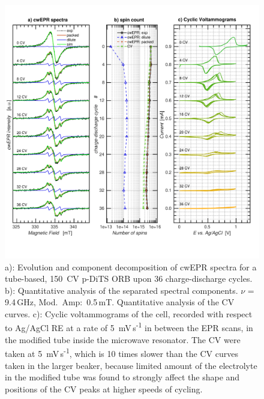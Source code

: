 \begin{figure}[!h]
\center
	\includegraphics[width=1\textwidth]{./operando_epr/figures/degradation/repeated_cycling_degradation_dits.pdf}
	\caption{a): Evolution and component decomposition of cwEPR spectra for a tube-based, 150~CV p-DiTS ORB upon 36 charge-discharge cycles. b): Quantitative analysis of the separated spectral components. $\nu$ = 9.4$\,$GHz, Mod.~Amp:~0.5$\,$mT. Quantitative analysis of the CV curves. c): Cyclic voltammograms of the cell, recorded with respect to Ag/AgCl RE at a rate of 5~mV\,s\textsuperscript{-1} in between the EPR scans, in the modified tube inside the microwave resonator. The CV were taken at 5~mV\,s\textsuperscript{-1}, which is 10 times slower than the CV curves taken in the larger beaker, because limited amount of the electrolyte in the modified tube was found to strongly affect the shape and positions of the CV peaks at higher speeds of cycling.}
	\label{fig:repeated_cycling_degradation}
\end{figure}



